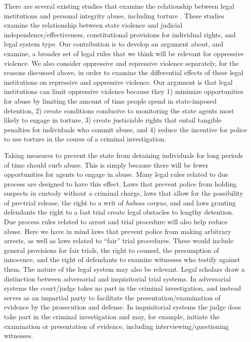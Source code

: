 \documentclass[12pt]{article}
\begin{document}
There are several existing studies that examine the relationship between legal institutions and personal integrity abuse, including torture \citep{Davenport1996,Cross1999,Keith2002PRQ,Keith2002,KeithTatePoe2009,PowellStaton2009,RiosStaton2012,ConradRitter2013,Mitchell2013,Conrad2014,HillJones2014,RitterConrad2016}. These studies examine the relationship between state violence and judicial independence/effectiveness, constitutional provisions for individual rights, and legal system type. Our contribution is to develop an argument about, and examine, a broader set of legal rules that we think will be relevant for oppressive violence. We also consider oppressive and repressive violence separately, for the reasons discussed above, in order to examine the differential effects of these legal institutions on repressive and oppressive violence. Our argument is that legal institutions can limit oppressive violence because they 1) minimize opportunities for abuse by limiting the amount of time people spend in state-imposed detention, 2) create conditions conducive to monitoring the state agents most likely to engage in torture, 3) create justiciable rights that entail tangible penalties for individuals who commit abuse, and 4) reduce the incentive for police to use torture in the course of a criminal investigation. 


Taking measures to prevent the state from detaining individuals for long periods of time should curb abuse. This is simply because there will be fewer opportunities for agents to engage in abuse. Many legal rules related to due process are designed to have this effect. Laws that prevent police from holding suspects in custody without a criminal charge, laws that allow for the possibility of pre-trial release, the right to a writ of {\em habeas corpus}, and and laws granting defendants the right to a fast trial create legal obstacles to lengthy detention. Due process rules related to arrest and trial procedure will also help reduce abuse. Here we have in mind laws that prevent police from making arbitrary arrests, as well as laws related to ``fair'' trial procedures. These would include general provisions for fair trials, the right to counsel, the presumption of innocence, and the right of defendants to examine witnesses who testify against them. The nature of the legal system may also be relevant. Legal scholars draw a distinction between adversarial and inquisitorial trial systems. In adversarial systems the court/judge takes no part in the criminal investigation, and instead serves as an impartial party to facilitate the presentation/examination of evidence by the prosecution and defense. In inquisitorial systems the judge does take part in the criminal investigation and may, for example, initiate the examination or presentation of evidence, including interviewing/questioning witnesses. 
\end{document}
